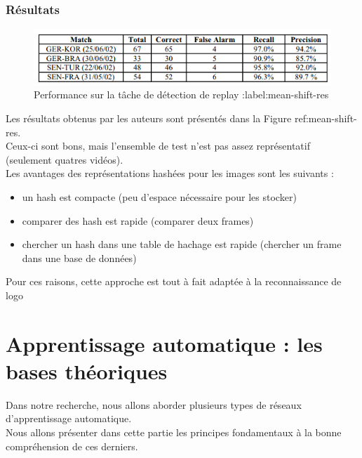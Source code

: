 \documentclass[11pt]{article}
\begin{document}
\subsubsection{Résultats}
\label{sec:orged93cd3}
\begin{figure}[htbp]
\centering
\includegraphics[width=.9\linewidth]{mean_shift_res.png}
\caption{Performance sur la tâche de détection de replay :label:mean-shift-res}
\end{figure}
Les résultats obtenus par les auteurs sont présentés dans la Figure ref:mean-shift-res.\\
Ceux-ci sont bons, mais l'ensemble de test n'est pas assez représentatif (seulement quatres vidéos).\\
Les avantages des représentations hashées pour les images sont les suivants :\\
\begin{itemize}
\item un hash est compacte (peu d'espace nécessaire pour les stocker)\\
\item comparer des hash est rapide (comparer deux frames)\\
\item chercher un hash dans une table de hachage est rapide (chercher un frame dans une base de données)\\
\end{itemize}
Pour ces raisons, cette approche est tout à fait adaptée à la reconnaissance de logo\\

\newpage
\section{Apprentissage automatique : les bases théoriques}
\label{sec:org5a765a6}
Dans notre recherche, nous allons aborder plusieurs types de réseaux d'apprentissage automatique.\\
Nous allons présenter dans cette partie les principes fondamentaux à la bonne compréhension de ces derniers.\\
\end{document}
